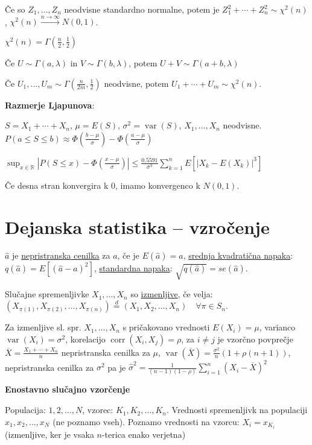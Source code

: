 \documentclass[11pt,a4paper]{amsart}
\theoremstyle{definition} %
\theoremstyle{plain} %
\newcommand{\R}{\mathbb R}
\DeclareMathOperator{\var}{var}
\DeclareMathOperator{\corr}{corr}
\begin{document}
Če so $Z_1,\ldots ,Z_n$ neodvisne standardno normalne, potem je $Z_1^2 + \cdots
+ Z_n^2 \sim \chi^2(n)$, $\chi^2 (n) \xrightarrow{n\rightarrow \infty} N(0,1)$.

$\chi^2(n) = \Gamma(\frac{n}{2}, \frac{1}{2})$

Če $U \sim \Gamma(a,\lambda)$ in $V \sim \Gamma(b, \lambda)$, potem $U+V \sim
\Gamma (a+b, \lambda)$

Če $U_1,\ldots , U_m \sim \Gamma(\frac{n}{2m},\frac{1}{2})$ neodvisne, potem
$U_1 + \cdots + U_m \sim \chi^2 (n)$.

\textbf{Razmerje Ljapunova}:

$S= X_1+\cdots + X_n$, $\mu = E(S)$, $\sigma^2 = \var(S)$, $X_1,\ldots , X_n$
neodvisne.  $P(a \leq S \leq b) \approx \Phi(\frac{b-\mu}{\sigma}) - \Phi
(\frac{a-\mu}{\sigma})$

$\sup_{x\in \R} |P(S\leq x) - \Phi (\frac{x-\mu}{\sigma})| \leq
\frac{0.5591}{\sigma^3} \sum_{k=1}^n E[|X_k - E(X_k)|^3]$

Če desna stran konvergira k 0, imamo konvergenco k $N(0,1)$.

\section*{Dejanska statistika -- vzročenje}

$\widehat{a}$ je \underline{nepristranska cenilka} za $a$, če je $E(\widehat{a}) = a$,
\underline{srednja kvadratična napaka}: $q(\widehat{a}) = E[(\widehat{a}-a)^2]$,
\underline{standardna napaka}: $\sqrt{q(\widehat{a})} = se(\widehat{a})$.

Slučajne spremenljivke $X_1,\ldots ,X_n$ so \underline{izmenljive}, če velja:
$(X_{\pi(1)},X_{\pi(2)},\ldots, X_{\pi(n)}) \stackrel{d}{=} (X_1,X_2,\ldots,X_n)
\quad \forall \pi \in S_n.$

Za izmenljive sl. spr. $X_1,\ldots ,X_n$ s pričakovano vrednosti $E(X_i) = \mu$,
varianco $\var(X_i) = \sigma^2$, korelacijo $\corr(X_i, X_j) = \rho$, za $i \neq
j$ je vzorčno povprečje $\overline{X} = \frac{X_1 + \cdots + X_n}{n}$ nepristranska
cenilka za $\mu$,  $\var(\overline{X}) = \frac{\sigma^2}{n}(1+\rho(n+1))$,
nepristranska cenilka za $\sigma^2$ pa je $\hat{\sigma}^2 =
\frac{1}{(n-1)(1-\rho)}\sum_{i=1}^n (X_i - \overline{X})^2 $

\textbf{Enostavno slučajno vzorčenje}

Populacija: $1,2,\ldots , N$, vzorec: $K_1, K_2, \ldots, K_n$. Vrednosti
spremenljivk na populaciji $x_1, x_2, \ldots, x_N$ (ne poznamo vseh). Poznamo
vrednosti na vzorcu: $X_i = x_{K_i}$ (izmenljive, ker je vsaka $n$-terica enako
verjetna)
\end{document}
